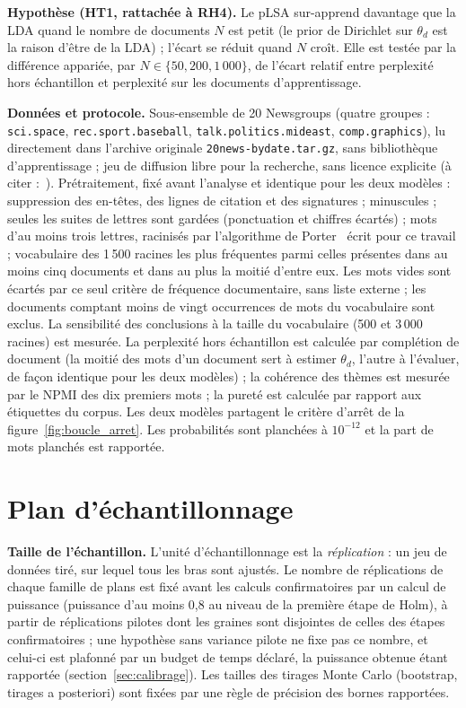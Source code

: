 

\textbf{Hypothèse (HT1, rattachée à RH4). }Le pLSA sur-apprend davantage que la LDA quand le nombre de documents $N$ est petit (le prior de Dirichlet sur $\theta_d$ est la raison d'être de la LDA) ; l'écart se réduit quand $N$ croît. Elle est testée par la différence appariée, par $N \in \{50, 200, 1\,000\}$, de l'écart relatif entre perplexité hors échantillon et perplexité sur les documents d'apprentissage.

\textbf{Données et protocole. }Sous-ensemble de 20 Newsgroups (quatre groupes : \texttt{sci.space}, \texttt{rec.sport.baseball}, \texttt{talk.politics.mideast}, \texttt{comp.graphics}), lu directement dans l'archive originale \texttt{20news-bydate.tar.gz}, sans bibliothèque d'apprentissage ; jeu de diffusion libre pour la recherche, sans licence explicite (à citer :~\cite{lang1995}). Prétraitement, fixé avant l'analyse et identique pour les deux modèles : suppression des en-têtes, des lignes de citation et des signatures ; minuscules ; seules les suites de lettres sont gardées (ponctuation et chiffres écartés) ; mots d'au moins trois lettres, racinisés par l'algorithme de Porter~\cite{porter1980} écrit pour ce travail ; vocabulaire des 1\,500 racines les plus fréquentes parmi celles présentes dans au moins cinq documents et dans au plus la moitié d'entre eux. Les mots vides sont écartés par ce seul critère de fréquence documentaire, sans liste externe ; les documents comptant moins de vingt occurrences de mots du vocabulaire sont exclus. La sensibilité des conclusions à la taille du vocabulaire (500 et 3\,000 racines) est mesurée. La perplexité hors échantillon est calculée par complétion de document (la moitié des mots d'un document sert à estimer $\theta_d$, l'autre à l'évaluer, de façon identique pour les deux modèles) ; la cohérence des thèmes est mesurée par le NPMI des dix premiers mots ; la pureté est calculée par rapport aux étiquettes du corpus. Les deux modèles partagent le critère d'arrêt de la figure~\ref{fig:boucle_arret}. Les probabilités sont planchées à $10^{-12}$ et la part de mots planchés est rapportée.

\section{Plan d'échantillonnage}\label{sec:echantillonnage}
\textbf{Taille de l'échantillon. }L'unité d'échantillonnage est la \emph{réplication} : un jeu de données tiré, sur lequel tous les bras sont ajustés. Le nombre de réplications de chaque famille de plans est fixé avant les calculs confirmatoires par un calcul de puissance (puissance d'au moins 0,8 au niveau de la première étape de Holm), à partir de réplications pilotes dont les graines sont disjointes de celles des étapes confirmatoires ; une hypothèse sans variance pilote ne fixe pas ce nombre, et celui-ci est plafonné par un budget de temps déclaré, la puissance obtenue étant rapportée (section~\ref{sec:calibrage}). Les tailles des tirages Monte Carlo (bootstrap, tirages a posteriori) sont fixées par une règle de précision des bornes rapportées.

